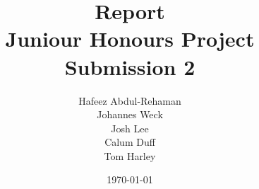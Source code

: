 \title{Report \\ Juniour Honours Project \\[0.5ex] Submission 2}
\author{Hafeez Abdul-Rehaman \\[1ex] Johannes Weck \\[1ex] Josh Lee \\[1ex] Calum Duff \\[2ex] Tom Harley}
\date{\today}

\makeatletter
	\def\@maketitle{
		\begin{center}
			\texttt{[image: title-logo]}\\[10ex]
			{\huge \bfseries \@title{ }}\\[1ex]
			\rule{0.5\textwidth}{.4pt}\\[1ex]
			{\LARGE \@author}\\[15ex]
			{\large \@date}
		\end{center}
	}
\makeatother
